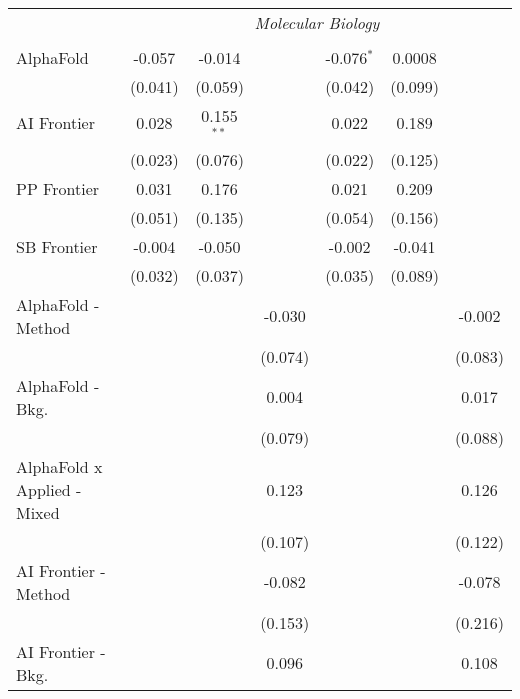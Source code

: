 \begin{tabular}{lcccccc}
 & \multicolumn{6}{c}{\textit{Molecular Biology}} \\ \\
   AlphaFold                     & -0.057  & -0.014       &               & -0.076$^{*}$ & 0.0008  &   \\   
                                 & (0.041) & (0.059)      &               & (0.042)      & (0.099) &   \\   
   AI Frontier                   & 0.028   & 0.155$^{**}$ &               & 0.022        & 0.189   &   \\   
                                 & (0.023) & (0.076)      &               & (0.022)      & (0.125) &   \\   
   PP Frontier                   & 0.031   & 0.176        &               & 0.021        & 0.209   &   \\   
                                 & (0.051) & (0.135)      &               & (0.054)      & (0.156) &   \\   
   SB Frontier                   & -0.004  & -0.050       &               & -0.002       & -0.041  &   \\   
                                 & (0.032) & (0.037)      &               & (0.035)      & (0.089) &   \\   
   AlphaFold - Method            &         &              & -0.030        &              &         & -0.002\\   
                                 &         &              & (0.074)       &              &         & (0.083)\\   
   AlphaFold - Bkg.              &         &              & 0.004         &              &         & 0.017\\   
                                 &         &              & (0.079)       &              &         & (0.088)\\   
   AlphaFold x Applied - Mixed   &         &              & 0.123         &              &         & 0.126\\   
                                 &         &              & (0.107)       &              &         & (0.122)\\   
   AI Frontier - Method          &         &              & -0.082        &              &         & -0.078\\   
                                 &         &              & (0.153)       &              &         & (0.216)\\   
   AI Frontier - Bkg.            &         &              & 0.096         &              &         & 0.108\\   

\end{tabular}
